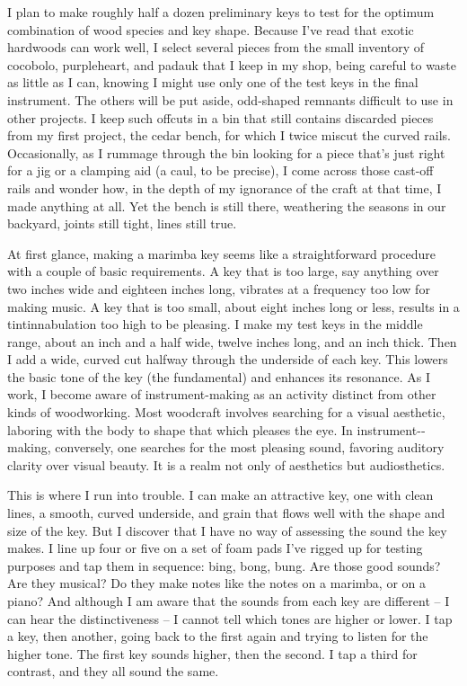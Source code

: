 \documentclass[letterpaper,10pt,headsepline]{scrreprt}
\begin{document}
I plan to make roughly half a dozen preliminary keys to test for the optimum combination of wood species and key shape. Because I’ve read that exotic hardwoods can work well, I select several pieces from the small inventory of cocobolo, purpleheart, and padauk that I keep in my shop, being careful to waste as little as I can, knowing I might use only one of the test keys in the final instrument. The others will be put aside, odd-­shaped remnants difficult to use in other projects. I keep such offcuts in a bin that still contains discarded pieces from my first project, the cedar bench, for which I twice miscut the curved rails. Occasionally, as I rummage through the bin looking for a piece that’s just right for a jig or a clamping aid (a caul, to be precise), I come across those cast-­off rails and wonder how, in the depth of my ignorance of the craft at that time, I made anything at all. Yet the bench is still there, weathering the seasons in our backyard, joints still tight, lines still true.

At first glance, making a marimba key seems like a straightforward procedure with a couple of basic re­quirements. A key that is too large, say anything over two inches wide and eighteen inches long, vibrates at a frequency too low for making music. A key that is too small, about eight inches long or less, results in a tintinnabulation too high to be pleasing. I make my test keys in the middle range, about an inch and a half wide, twelve inches long, and an inch thick. Then I add a wide, curved cut halfway through the underside of each key. This lowers the basic tone of the key (the fundamental) and enhances its resonance. As I work, I become aware of instrument-­making as an activity distinct from other kinds of woodworking. Most woodcraft involves searching for a visual aesthetic, laboring with the body to shape that which pleases the eye. In instrument-­making, conversely, one searches for the most pleasing sound, favoring auditory clarity over visual beauty. It is a realm not only of aesthetics but audiosthetics.

This is where I run into trouble. I can make an attractive key, one with clean lines, a smooth, curved underside, and grain that flows well with the shape and size of the key. But I discover that I have no way of assessing the sound the key makes. I line up four or five on a set of foam pads I’ve rigged up for testing purposes and tap them in sequence: bing, bong, bung. Are those good sounds? Are they musical? Do they make notes like the notes on a marimba, or on a piano? And although I am aware that the sounds from each key are different – I can hear the distinctiveness – I cannot tell which tones are higher or lower. I tap a key, then another, going back to the first again and trying to listen for the higher tone. The first key sounds higher, then the second. I tap a third for contrast, and they all sound the same.
\end{document}
